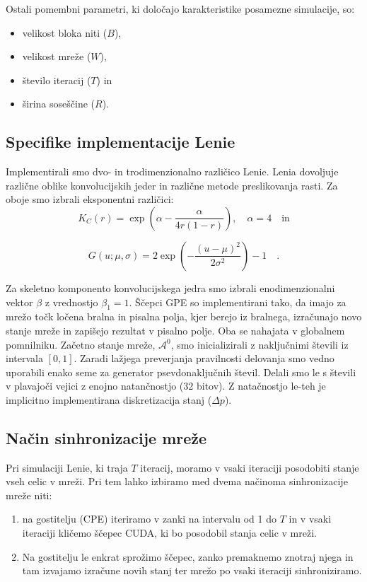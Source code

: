 \documentclass[a4paper, 12pt, openright]{book}
\begin{document}
Ostali pomembni parametri, ki določajo karakteristike posamezne simulacije, so:
\begin{itemize}
    \item velikost bloka niti (\(B\)),
    \item velikost mreže (\(W\)),
    \item število iteracij (\(T\)) in
    \item širina soseščine (\(R\)).
\end{itemize}

\subsection{Specifike implementacije Lenie}

Implementirali smo dvo- in trodimenzionalno različico Lenie.
Lenia dovoljuje različne oblike konvolucijskih jeder in različne metode preslikovanja rasti.
Za oboje smo izbrali eksponentni različici:
\begin{equation}
K_C(r) = \exp \left( \alpha - \frac{\alpha}{4r(1 - r)} \right),\quad\alpha = 4\quad\text{in}
\end{equation}

\begin{equation}
G(u; \mu, \sigma) = 2 \exp \left( - \frac{(u - \mu)^2}{2 \sigma^2} \right) - 1\quad.
\end{equation}

Za skeletno komponento konvolucijskega jedra smo izbrali enodimenzionalni vektor \(\beta\) z vrednostjo \(\beta_1 = 1\).
Ščepci GPE so implementirani tako, da imajo za mrežo točk ločena bralna in pisalna polja, kjer berejo iz bralnega, izračunajo novo stanje mreže in zapišejo rezultat v pisalno polje. Oba se nahajata v globalnem pomnilniku.
Začetno stanje mreže, \(\mathcal{A}^0\), smo inicializirali z naključnimi števili iz intervala \([0, 1]\).
Zaradi lažjega preverjanja pravilnosti delovanja smo vedno uporabili enako seme za generator psevdonaključnih števil.
Delali smo le s števili v plavajoči vejici z enojno natančnostjo (32 bitov). Z natačnostjo le-teh je implicitno implementirana diskretizacija stanj (\(\Delta p\)).

\subsection{Način sinhronizacije mreže}

Pri simulaciji Lenie, ki traja \(T\) iteracij, moramo v vsaki iteraciji posodobiti stanje vseh celic v mreži. Pri tem lahko izbiramo med dvema načinoma sinhronizacije mreže niti:
\begin{enumerate}[label=(\alph*)]
    \item na gostitelju (CPE) iteriramo v zanki na intervalu od 1 do \(T\) in v vsaki iteraciji kličemo ščepec CUDA, ki bo posodobil stanja celic v mreži.
    \item Na gostitelju le enkrat sprožimo ščepec, zanko premaknemo znotraj njega in tam izvajamo izračune novih stanj ter mrežo po vsaki iteraciji sinhroniziramo.
\end{enumerate}
\end{document}
